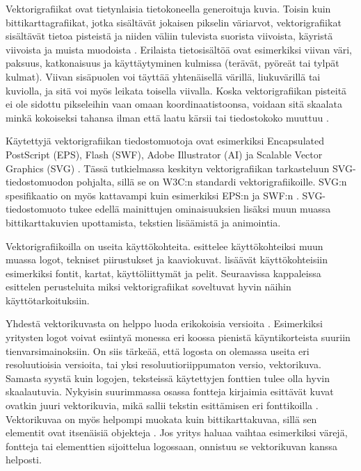 \documentclass[utf8,bachelor]{gradu3}
\begin{document}
Vektorigrafiikat ovat tietynlaisia tietokoneella generoituja kuvia. Toisin kuin bittikarttagrafiikat, jotka sisältävät jokaisen pikselin väriarvot, vektorigrafiikat sisältävät tietoa pisteistä ja niiden väliin tulevista suorista viivoista, käyristä viivoista ja muista muodoista \parencites{RefWorks:doc:5bdc5224e4b05afcfde5b159}{RefWorks:doc:5bdc5292e4b05afcfde5b171}. Erilaista tietosisältöä ovat esimerkiksi viivan väri, paksuus, katkonaisuus ja käyttäytyminen kulmissa (terävät, pyöreät tai tylpät kulmat). Viivan sisäpuolen voi täyttää yhtenäisellä värillä, liukuvärillä tai kuviolla, ja sitä voi myös leikata toisella viivalla. \parencite{RefWorks:doc:5bd74719e4b0e42e08f6333b} Koska vektorigrafiikan pisteitä ei ole sidottu pikseleihin vaan omaan koordinaatistoonsa, voidaan sitä skaalata minkä kokoiseksi tahansa ilman että laatu kärsii tai tiedostokoko muuttuu \parencite{RefWorks:doc:5bdc5292e4b05afcfde5b171}.

Käytettyjä vektorigrafiikan tiedostomuotoja ovat esimerkiksi Encapsulated PostScript (EPS), Flash (SWF), Adobe Illustrator (AI) ja Scalable Vector Graphics (SVG) \parencite{RefWorks:doc:5bdc5224e4b05afcfde5b159}. Tässä tutkielmassa keskityn vektorigrafiikan tarkasteluun SVG-tiedostomuodon pohjalta, sillä se on W3C:n standardi vektorigrafiikoille. SVG:n spesifikaatio on myös kattavampi kuin esimerkiksi EPS:n \parencite{RefWorks:doc:5bdc900de4b0afdabde32fb7} ja SWF:n \parencite{RefWorks:doc:5bdc9306e4b069b454d8459e}. SVG-tiedostomuoto tukee edellä mainittujen ominaisuuksien lisäksi muun muassa bittikarttakuvien upottamista, tekstien lisäämistä ja animointia. \parencite{RefWorks:doc:5bd74719e4b0e42e08f6333b}

Vektorigrafiikoilla on useita käyttökohteita. \textcite{RefWorks:doc:5bdc5224e4b05afcfde5b159} esittelee käyttökohteiksi muun muassa logot, tekniset piirustukset ja kaaviokuvat. \textcite{RefWorks:doc:5bdd9b5ae4b0954dddb26329} lisäävät käyttökohteisiin esimerkiksi fontit, kartat, käyttöliittymät ja pelit. Seuraavissa kappaleissa esittelen perusteluita miksi vektorigrafiikat soveltuvat hyvin näihin käyttötarkoituksiin.

Yhdestä vektorikuvasta on helppo luoda erikokoisia versioita \parencite{RefWorks:doc:5bdc5224e4b05afcfde5b159}. Esimerkiksi yritysten logot voivat esiintyä monessa eri koossa pienistä käyntikorteista suuriin tienvarsimainoksiin. On siis tärkeää, että logosta on olemassa useita eri resoluutioisia versioita, tai yksi resoluutioriippumaton versio, vektorikuva. Samasta syystä kuin logojen, teksteissä käytettyjen fonttien tulee olla hyvin skaalautuvia. Nykyisin suurimmassa osassa fontteja kirjaimia esittävät kuvat ovatkin juuri vektorikuvia, mikä sallii tekstin esittämisen eri fonttikoilla \parencite{RefWorks:doc:5bdc5224e4b05afcfde5b159}. Vektorikuvaa on myös helpompi muokata kuin bittikarttakuvaa, sillä sen elementit ovat itsenäisiä objekteja \parencite{RefWorks:doc:5bdc5224e4b05afcfde5b159}. Jos yritys haluaa vaihtaa esimerkiksi värejä, fontteja tai elementtien sijoittelua logossaan, onnistuu se vektorikuvan kanssa helposti.
\end{document}

